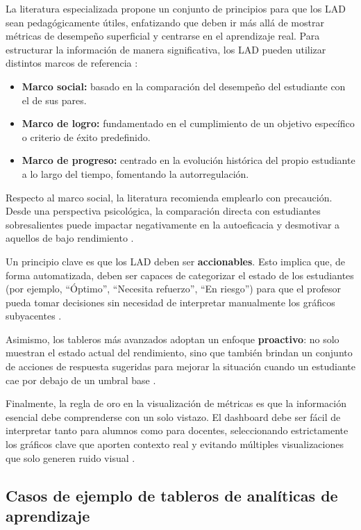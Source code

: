 La literatura especializada propone un conjunto de principios para que los LAD sean pedagógicamente útiles, enfatizando que deben ir más allá de mostrar métricas de desempeño superficial y centrarse en el aprendizaje real. Para estructurar la información de manera significativa, los LAD pueden utilizar distintos marcos de referencia \cite{susnjak_learning_2022}:

\begin{itemize}
	\item \textbf{Marco social:} basado en la comparación del desempeño del estudiante con el de sus pares.
	\item \textbf{Marco de logro:} fundamentado en el cumplimiento de un objetivo específico o criterio de éxito predefinido.
	\item \textbf{Marco de progreso:} centrado en la evolución histórica del propio estudiante a lo largo del tiempo, fomentando la autorregulación.
\end{itemize}

Respecto al marco social, la literatura recomienda emplearlo con precaución. Desde una perspectiva psicológica, la comparación directa con estudiantes sobresalientes puede impactar negativamente en la autoeficacia y desmotivar a aquellos de bajo rendimiento \cite{rahimi2021learning}.

Un principio clave es que los LAD deben ser \textbf{accionables}. Esto implica que, de forma automatizada, deben ser capaces de categorizar el estado de los estudiantes (por ejemplo, ``Óptimo'', ``Necesita refuerzo'', ``En riesgo'') para que el profesor pueda tomar decisiones sin necesidad de interpretar manualmente los gráficos subyacentes \cite{rahimi2021learning}. 

Asimismo, los tableros más avanzados adoptan un enfoque \textbf{proactivo}: no solo muestran el estado actual del rendimiento, sino que también brindan un conjunto de acciones de respuesta sugeridas para mejorar la situación cuando un estudiante cae por debajo de un umbral base \cite{rahimi2021learning}. 

Finalmente, la regla de oro en la visualización de métricas es que la información esencial debe comprenderse con un solo vistazo. El dashboard debe ser fácil de interpretar tanto para alumnos como para docentes, seleccionando estrictamente los gráficos clave que aporten contexto real y evitando múltiples visualizaciones que solo generen ruido visual \cite{ilearn2023dashboards}.

\subsection{Casos de ejemplo de tableros de analíticas de aprendizaje}

